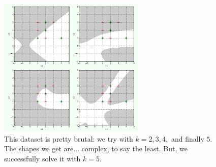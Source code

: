             \begin{figure}[H]
                \centering
                
                \includegraphics[width=70mm,scale=0.5]{images/feature_images/harder_dataset.png}
                \caption*{This dataset is pretty brutal: we try with $k=2,3,4,$ and finally $5$. The shapes we get are... complex, to say the least. But, we successfully solve it with $k=5$.}
            \end{figure}
